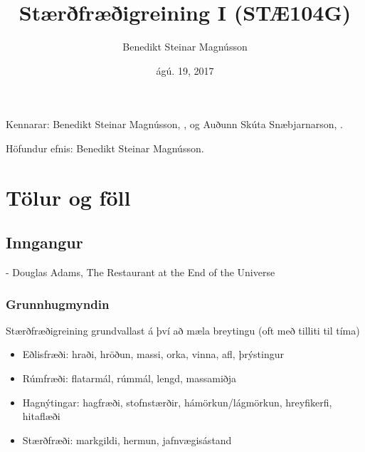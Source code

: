 \documentclass[a4paper,10pt,icelandic]{sphinxmanual}
\title{Stærðfræðigreining I (STÆ104G)}
\date{ágú. 19, 2017}
\author{Benedikt Steinar Magnússon}
\begin{document}
\maketitle
\sphinxtableofcontents
{}\label{\detokenize{index::doc}}


Kennarar: Benedikt Steinar Magnússon, , og
Auðunn Skúta Snæbjarnarson, .

Höfundur efnis: Benedikt Steinar Magnússon.


\chapter{Tölur og föll}
\label{\detokenize{kafli01::doc}}\label{\detokenize{kafli01:tolur-og-foll}}\label{\detokenize{kafli01:staerfraeigreining-i-stae104g-haskoli-islands-haust-2017}}

\section{Inngangur}
\label{\detokenize{kafli01:inngangur}}

- Douglas Adams, The Restaurant at the End of the Universe


\subsection{Grunnhugmyndin}
\label{\detokenize{kafli01:grunnhugmyndin}}
Stærðfræðigreining grundvallast á því að mæla breytingu (oft með tilliti
til tíma)
\begin{itemize}
\item {} 
Eðlisfræði: hraði, hröðun, massi, orka, vinna, afl, þrýstingur

\item {} 
Rúmfræði: flatarmál, rúmmál, lengd, massamiðja

\item {} 
Hagnýtingar: hagfræði, stofnstærðir, hámörkun/lágmörkun, hreyfikerfi, hitaflæði

\item {} 
Stærðfræði: markgildi, hermun, jafnvægisástand

\end{itemize}
\end{document}
